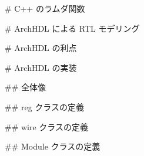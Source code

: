 # C++ のラムダ関数






# ArchHDL による RTL モデリング







# ArchHDL の利点







# ArchHDL の実装









## 全体像







## reg クラスの定義





## wire クラスの定義





## Module クラスの定義





